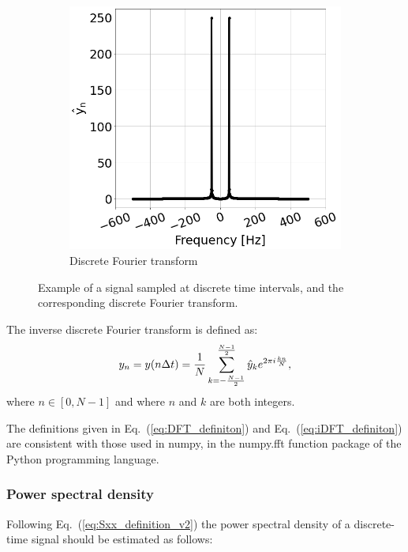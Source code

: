 \begin{figure}[!ht]
\begin{subfigure}[t]{0.45\textwidth}
        \includegraphics[width=1\textwidth]{./images/app_B/simple_signal_1freq_fft_example.png}
        \caption{Discrete Fourier transform}
        \label{fig:signal_and_DFT_example_b}
    \end{subfigure}
    \hfill
     \caption{Example of a signal sampled at discrete time intervals, and the corresponding discrete Fourier transform.}
     \label{fig:signal_and_DFT_example}
\end{figure}

The inverse discrete Fourier transform is defined as:
\begin{equation}\label{eq:iDFT_definiton}
 y_n =  y(n\Delta t) = \frac{1}{N} \sum_{k=-\frac{N-1}{2}}^{\frac{N-1}{2}} \hat{y}_k e^{2\pi {i} \frac{k n}{N}},
\end{equation}
where $n \in \left[0,N-1 \right ]$ and where $n$ and $k$ are both integers.

The definitions given in Eq.~(\ref{eq:DFT_definiton}) and Eq.~(\ref{eq:iDFT_definiton}) are consistent with those used in numpy, in the numpy.fft function \cite{numpy_fft} package of the Python programming language. 

\subsubsection*{Power spectral density} %
Following Eq.~(\ref{eq:Sxx_definition_v2}) the power spectral density of a discrete-time signal should be estimated as follows: